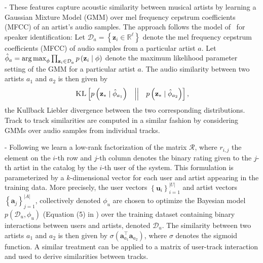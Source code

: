  -
These features capture acoustic similarity between musical artists by learning a Gaussian Mixture Model (GMM) over mel frequency cepstrum coefficients (MFCC) of an artist's audio samples. The approach follows the model of~\cite{ReynoldsQD00} for speaker identification: 
Let $\mathcal{D}_a=\left\{\mathbf{z}_i \in \mathbb{R}^\ell\right\}$ denote the mel frequency cepstrum coefficients (MFCC) of audio samples from a particular artist $a$. 
Let $\hat{\phi}_a=\argmax_{\phi} \prod_{\mathbf{z}_i\in\mathcal{D}_a} p\left(\mathbf{z}_i\mid\phi\right)$ denote the maximum likelihood parameter setting of the GMM for a particular artist $a$. The audio similarity between two artists $a_1$ and $a_2$ is then given by \begin{equation}\textsc{KL}\left[ p\left(\mathbf{z_*}\mid\hat{\phi}_{a_1}\right) \quad \middle| \middle| \quad  p\left(\mathbf{z_*} \mid \hat{\phi}_{a_2}\right)\right
],\end{equation} the Kullback Liebler divergence between the two corresponding distributions.
Track to track similarities are computed in a similar fashion by considering GMMs over audio samples from individual tracks.  

 -
Following \cite{xbox-www} we learn a low-rank factorization of the matrix $\mathcal{R}$,
 where $r_{i,j}$ the element on the $i$-th row and $j$-th column denotes the binary rating given to the $j$-th artist in the catalog by the $i$-th user of the system. This formulation is parameterized by a $k$-dimensional vector for each user and artist appearing in the training data. More precisely, the user vectors $\left\{\mathbf{u}_i\right\}_{i=1}^{|U|}$ and artist vectors $\left\{\mathbf{a}_j\right\}_{j=1}^{|A|}$, collectively denoted $\phi_u$ are chosen to optimize the Bayesian model $p(\mathcal{D}_u,\phi_u)$ (Equation (5) in \cite{xbox-www}) over the training dataset containing binary interactions between users and artists, denoted $\mathcal{D}_u$.  The similarity between two artists $a_1$ and $a_2$ is then given by $\sigma \left(\mathbf{a}_{a_1}^\top\mathbf{a}_{a_2}\right)$, where $\sigma$ denotes the sigmoid function. A similar treatment can be applied to a matrix of user-track interaction and used to derive similarities between tracks.

